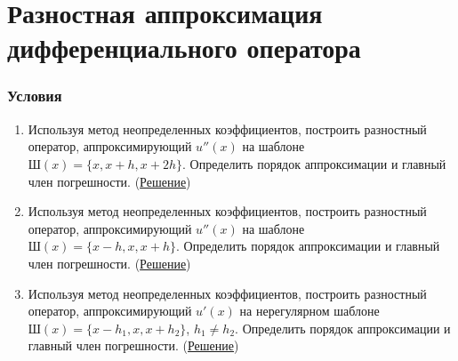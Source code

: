 \documentclass[a4paper, 12pt]{article}
\begin{document}
	\section*{Разностная аппроксимация дифференциального оператора}
	\subsubsection*{Условия}
	\begin{enumerate}
		\item Используя метод неопределенных коэффициентов, построить разностный оператор, аппроксимирующий $u''(x)$ на шаблоне $\text{Ш}(x) = \{x, x+h, x+2h\}$. Определить порядок аппроксимации и главный член погрешности. (\hyperlink{t1}{Решение})
		\item Используя метод неопределенных коэффициентов, построить разностный оператор, аппроксимирующий $u''(x)$ на шаблоне $\text{Ш}(x) = \{x-h, x, x+h\}$. Определить порядок аппроксимации и главный член погрешности. (\hyperlink{t2}{Решение})
		\item Используя метод неопределенных коэффициентов, построить разностный оператор, аппроксимирующий $u'(x)$ на нерегулярном шаблоне $\text{Ш}(x) = \{x-h_1, x, x+h_2\}$, $h_1 \ne h_2$. Определить порядок аппроксимации и главный член погрешности. (\hyperlink{t3}{Решение})
	\end{enumerate}
	
	\newpage
\end{document}

